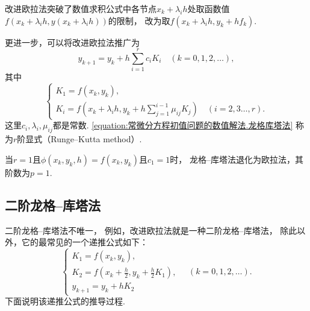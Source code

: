 改进欧拉法突破了数值求积公式中各节点\(x_k + \lambda_i h\)处取函数值\(f(x_k + \lambda_i h,y(x_k + \lambda_i h))\)的限制，
改为取\(f(x_k + \lambda_i h,y_k + h f_k)\).

更进一步，可以将改进欧拉法推广为\begin{equation}\label{equation:常微分方程初值问题的数值解法.龙格库塔法}
	y_{k+1}
	= y_k
	+ h \sum_{i=1}^r c_i K_i
	\quad(k=0,1,2,\dotsc),
\end{equation}
其中\begin{equation}
	\begin{cases}
		K_1 = f(x_k,y_k), \\
		K_i = f\left( x_k + \lambda_i h, y_k + h \sum_{j=1}^{i-1} \mu_{ij} K_j \right)
		\quad(i=2,3\dotsc,r).
	\end{cases}
\end{equation}
这里\(c_i,\lambda_i,\mu_{ij}\)都是常数.
\cref{equation:常微分方程初值问题的数值解法.龙格库塔法}
称为\(r\)阶显式（Runge--Kutta method）.

当\(r=1\)且\(\phi(x_k,y_k,h) = f(x_k,y_k)\)且\(c_1=1\)时，
龙格--库塔法退化为欧拉法，其阶数为\(p=1\).

\subsection{二阶龙格--库塔法}
二阶龙格--库塔法不唯一，
例如，改进欧拉法就是一种二阶龙格--库塔法，
除此以外，它的最常见的一个递推公式如下：
\begin{equation}\label{equation:常微分方程初值问题的数值解法.2阶龙格库塔法}
	\begin{cases}
		K_1 = f(x_k,y_k), \\
		K_2 = f\left( x_k + \frac{h}{2}, y_k + \frac{h}{2} K_1 \right), \\
		y_{k+1} = y_k + h K_2
	\end{cases}
	\quad(k=0,1,2,\dotsc).
\end{equation}
下面说明该递推公式的推导过程.

